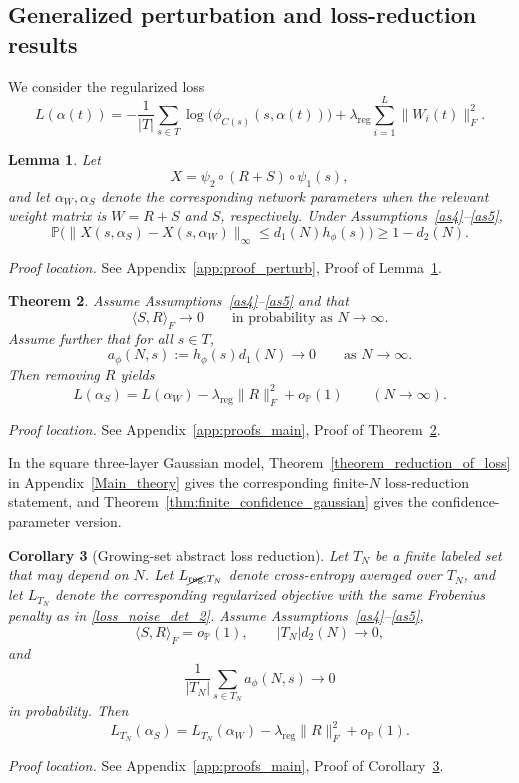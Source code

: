 \documentclass[11pt]{article}
\theoremstyle{plain}
\newtheorem{thm}{Theorem}[section]
\newtheorem{cor}[thm]{Corollary}
\newtheorem{lem}[thm]{Lemma}
\theoremstyle{definition}
\theoremstyle{remark}
\newcommand{\PP}{\mathbb{P}}
\newcommand{\1}{\mathbf{1}}
\newcommand{\proofloc}[1]{\par\noindent\emph{Proof location.} #1\par}
\begin{document}
\subsection{Generalized perturbation and loss-reduction results}
\label{decrease_in_loss}

We consider the regularized loss
\begin{equation}
\label{loss_noise_det_2}
L(\alpha(t))
=
-\frac{1}{|T|}\sum_{s\in T}\log\big(\phi_{C(s)}(s,\alpha(t))\big)
+
\lambda_{\mathrm{reg}}
\sum_{i=1}^{L}\|W_i(t)\|_F^2.
\end{equation}

\begin{lem}
\label{lem:remove_R_general}
Let
\[
X=\psi_2\circ (R+S)\circ \psi_1(s),
\]
and let \(\alpha_W,\alpha_S\) denote the corresponding network parameters when the relevant weight matrix is \(W=R+S\) and \(S\), respectively. Under Assumptions~\ref{as4}--\ref{as5},
\[
\PP\Big(
\|X(s,\alpha_S)-X(s,\alpha_W)\|_\infty
\le d_1(N)h_\phi(s)
\Big)
\ge 1-d_2(N).
\]
\end{lem}
\proofloc{See Appendix~\ref{app:proof_perturb}, Proof of Lemma~\ref{lem:remove_R_general}.}

\begin{thm}
\label{theorem_reduction_of_loss_general}
Assume Assumptions~\ref{as4}--\ref{as5} and that
\[
\langle S,R\rangle_F\to0
\qquad\text{in probability as }N\to\infty.
\]
Assume further that for all \(s\in T\),
\[
a_\phi(N,s):=h_\phi(s)d_1(N)\to0
\qquad\text{as }N\to\infty.
\]
Then removing \(R\) yields
\[
L(\alpha_S)=L(\alpha_W)-\lambda_{\mathrm{reg}}\|R\|_F^2+o_{\PP}(1)
\qquad(N\to\infty).
\]
\end{thm}
\proofloc{See Appendix~\ref{app:proofs_main}, Proof of Theorem~\ref{theorem_reduction_of_loss_general}.}

In the square three-layer Gaussian model, Theorem~\ref{theorem_reduction_of_loss} in Appendix~\ref{Main_theory} gives the corresponding finite-\(N\) loss-reduction statement, and Theorem~\ref{thm:finite_confidence_gaussian} gives the confidence-parameter version.

\begin{cor}[Growing-set abstract loss reduction]
\label{cor:growing_set_abstract_loss}
Let \(T_N\) be a finite labeled set that may depend on \(N\). Let \(L_{\cancel{\mathrm{reg}},T_N}\) denote cross-entropy averaged over \(T_N\), and let \(L_{T_N}\) denote the corresponding regularized objective with the same Frobenius penalty as in \eqref{loss_noise_det_2}. Assume Assumptions~\ref{as4}--\ref{as5},
\[
\langle S,R\rangle_F=o_{\PP}(1),
\qquad
|T_N|d_2(N)\to0,
\]
and
\[
\frac{1}{|T_N|}\sum_{s\in T_N}a_\phi(N,s)\to0
\]
in probability. Then
\[
L_{T_N}(\alpha_S)
=
L_{T_N}(\alpha_W)
-\lambda_{\mathrm{reg}}\|R\|_F^2
+o_{\PP}(1).
\]
\end{cor}
\proofloc{See Appendix~\ref{app:proofs_main}, Proof of Corollary~\ref{cor:growing_set_abstract_loss}.}
\end{document}
